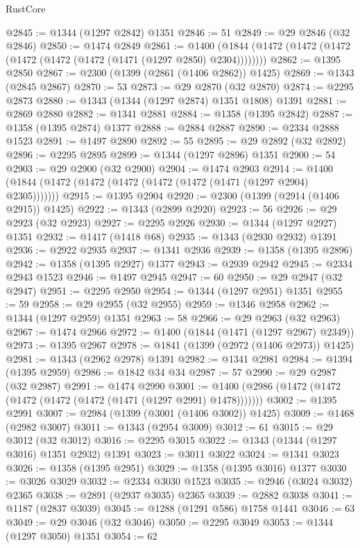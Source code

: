 \begin{lexlean}{RustCore}
\begin{coremodule}
@2845 := @1344 (@1297 @2842) @1351
@2846 := 51
@2849 := @29 @2846 (@32 @2846)
@2850 := @1474 @2849
@2861 := @1400 (@1844 (@1472 (@1472 (@1472 (@1472 (@1472 (@1472 (@1471 (@1297 @2850) @2304))))))))
@2862 := @1395 @2850
@2867 := @2300 (@1399 (@2861 (@1406 @2862)) @1425)
@2869 := @1343 (@2845 @2867)
@2870 := 53
@2873 := @29 @2870 (@32 @2870)
@2874 := @2295 @2873
@2880 := @1343 (@1344 (@1297 @2874) @1351 @1808) @1391
@2881 := @2869 @2880
@2882 := @1341 @2881
@2884 := @1358 (@1395 @2842)
@2887 := @1358 (@1395 @2874) @1377
@2888 := @2884 @2887
@2890 := @2334 @2888 @1523
@2891 := @1497 @2890
@2892 := 55
@2895 := @29 @2892 (@32 @2892)
@2896 := @2295 @2895
@2899 := @1344 (@1297 @2896) @1351
@2900 := 54
@2903 := @29 @2900 (@32 @2900)
@2904 := @1474 @2903
@2914 := @1400 (@1844 (@1472 (@1472 (@1472 (@1472 (@1472 (@1471 (@1297 @2904) @2305)))))))
@2915 := @1395 @2904
@2920 := @2300 (@1399 (@2914 (@1406 @2915)) @1425)
@2922 := @1343 (@2899 @2920)
@2923 := 56
@2926 := @29 @2923 (@32 @2923)
@2927 := @2295 @2926
@2930 := @1344 (@1297 @2927) @1351
@2932 := @1417 (@1418 @68)
@2935 := @1343 (@2930 @2932) @1391
@2936 := @2922 @2935
@2937 := @1341 @2936
@2939 := @1358 (@1395 @2896)
@2942 := @1358 (@1395 @2927) @1377
@2943 := @2939 @2942
@2945 := @2334 @2943 @1523
@2946 := @1497 @2945
@2947 := 60
@2950 := @29 @2947 (@32 @2947)
@2951 := @2295 @2950
@2954 := @1344 (@1297 @2951) @1351
@2955 := 59
@2958 := @29 @2955 (@32 @2955)
@2959 := @1346 @2958
@2962 := @1344 (@1297 @2959) @1351
@2963 := 58
@2966 := @29 @2963 (@32 @2963)
@2967 := @1474 @2966
@2972 := @1400 (@1844 (@1471 (@1297 @2967) @2349))
@2973 := @1395 @2967
@2978 := @1841 (@1399 (@2972 (@1406 @2973)) @1425)
@2981 := @1343 (@2962 @2978) @1391
@2982 := @1341 @2981
@2984 := @1394 (@1395 @2959)
@2986 := @1842 @34 @34
@2987 := 57
@2990 := @29 @2987 (@32 @2987)
@2991 := @1474 @2990
@3001 := @1400 (@2986 (@1472 (@1472 (@1472 (@1472 (@1472 (@1471 (@1297 @2991) @1478)))))))
@3002 := @1395 @2991
@3007 := @2984 (@1399 (@3001 (@1406 @3002)) @1425)
@3009 := @1468 (@2982 @3007)
@3011 := @1343 (@2954 @3009)
@3012 := 61
@3015 := @29 @3012 (@32 @3012)
@3016 := @2295 @3015
@3022 := @1343 (@1344 (@1297 @3016) @1351 @2932) @1391
@3023 := @3011 @3022
@3024 := @1341 @3023
@3026 := @1358 (@1395 @2951)
@3029 := @1358 (@1395 @3016) @1377
@3030 := @3026 @3029
@3032 := @2334 @3030 @1523
@3035 := @2946 (@3024 @3032) @2365
@3038 := @2891 (@2937 @3035) @2365
@3039 := @2882 @3038
@3041 := @1187 (@2837 @3039)
@3045 := @1288 (@1291 @586) @1758 @1441
@3046 := 63
@3049 := @29 @3046 (@32 @3046)
@3050 := @2295 @3049
@3053 := @1344 (@1297 @3050) @1351
@3054 := 62

\end{coremodule}
\end{lexlean}
